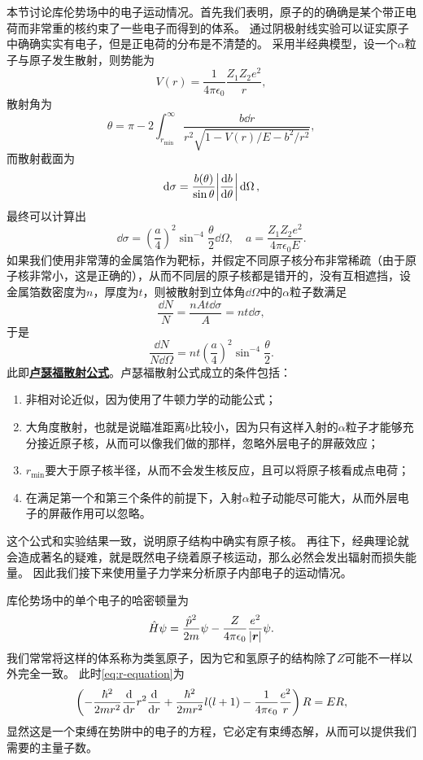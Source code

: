\documentclass[UTF8, a4paper]{ctexart}
\newcommand*{\concept}[1]{\underline{\textbf{#1}}}
\begin{document}
本节讨论库伦势场中的电子运动情况。首先我们表明，原子的的确确是某个带正电荷而非常重的核约束了一些电子而得到的体系。
通过阴极射线实验可以证实原子中确确实实有电子，但是正电荷的分布是不清楚的。
采用半经典模型，设一个$\alpha$粒子与原子发生散射，则势能为
\begin{equation}
    V(r) = \frac{1}{4\pi \epsilon_0} \frac{Z_1 Z_2 e^2}{r}, 
\end{equation}
散射角为
\[
    \theta = \pi - 2 \int_{r_\text{min}}^\infty \frac{b \dd{r}}{r^2 \sqrt{1 - V(r)/E - b^2/r^2}},  
\]
而散射截面为
\[
    \dd{\sigma} = \frac{b(\theta)}{\sin \theta} \abs{\dv{b}{\theta}} \dd{\Omega},
\]
最终可以计算出
\begin{equation}
    \dd{\sigma} = \left(\frac{a}{4}\right)^2 \sin^{-4}\frac{\theta}{2} \dd{\Omega}, \quad a = \frac{Z_1 Z_2 e^2}{4\pi \epsilon_0 E}.    
\end{equation}
如果我们使用非常薄的金属箔作为靶标，并假定不同原子核分布非常稀疏（由于原子核非常小，这是正确的），从而不同层的原子核都是错开的，没有互相遮挡，设金属箔数密度为$n$，厚度为$t$，则被散射到立体角$\dd{\Omega}$中的$\alpha$粒子数满足
\[
    \frac{\dd{N}}{N} = \frac{n A t \dd{\sigma}}{A} = nt \dd{\sigma},
\]
于是
\begin{equation}
    \frac{\dd{N}}{N \dd{\Omega}} = n t \left(\frac{a}{4}\right)^2 \sin^{-4}\frac{\theta}{2}.
\end{equation}
此即\concept{卢瑟福散射公式}。卢瑟福散射公式成立的条件包括：
\begin{enumerate}
    \item 非相对论近似，因为使用了牛顿力学的动能公式；
    \item 大角度散射，也就是说瞄准距离$b$比较小，因为只有这样入射的$\alpha$粒子才能够充分接近原子核，从而可以像我们做的那样，忽略外层电子的屏蔽效应；
    \item $r_\text{min}$要大于原子核半径，从而不会发生核反应，且可以将原子核看成点电荷；
    \item 在满足第一个和第三个条件的前提下，入射$\alpha$粒子动能尽可能大，从而外层电子的屏蔽作用可以忽略。
\end{enumerate}
这个公式和实验结果一致，说明原子结构中确实有原子核。
再往下，经典理论就会造成著名的疑难，就是既然电子绕着原子核运动，那么必然会发出辐射而损失能量。
因此我们接下来使用量子力学来分析原子内部电子的运动情况。

库伦势场中的单个电子的哈密顿量为
\begin{equation}
    \hat{H} \psi = \frac{\hat{p}^2}{2m} \psi - \frac{Z}{4\pi \epsilon_0} \frac{e^2}{\abs{\vb*{r}}} \psi.
    \label{eq:columb-electron-hamiltonian}
\end{equation}
我们常常将这样的体系称为类氢原子，因为它和氢原子的结构除了$Z$可能不一样以外完全一致。
此时\eqref{eq:r-equation}为
\[
    \left( - \frac{\hbar^2}{2m r^2} \dv{r} r^2 \dv{r} + \frac{\hbar^2}{2m r^2} l(l+1) - \frac{1}{4\pi \epsilon_0} \frac{e^2}{r} \right) R = E R,
\]
显然这是一个束缚在势阱中的电子的方程，它必定有束缚态解，从而可以提供我们需要的主量子数。
\end{document}
